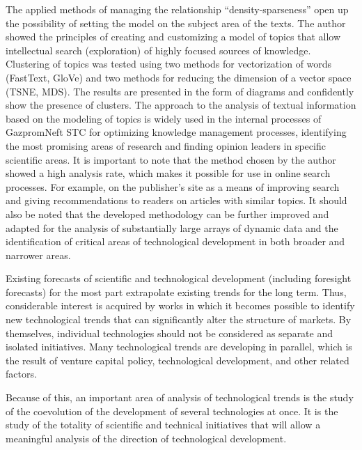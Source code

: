 \documentclass[12pt]{report}
\theoremstyle{definition}
\begin{document}
The applied methods of managing the relationship ``density-sparseness'' open up the possibility of setting the model on the subject area of the texts.
The author showed the principles of creating and customizing a model of topics that allow intellectual search (exploration) of highly focused sources of knowledge.
Clustering of topics was tested using two methods for vectorization of words (FastText, GloVe) and two methods for reducing the dimension of a vector space (TSNE, MDS). 
The results are presented in the form of diagrams and confidently show the presence of clusters.
The approach to the analysis of textual information based on the modeling of topics is widely used in the internal processes of GazpromNeft STC for optimizing knowledge management processes, identifying the most promising areas of research and finding opinion leaders in specific scientific areas.
It is important to note that the method chosen by the author showed a high analysis rate, which makes it possible for use in online search processes. For example, on the publisher's site as a means of improving search and giving recommendations to readers on articles with similar topics.
It should also be noted that the developed methodology can be further improved and adapted for the analysis of substantially large arrays of dynamic data and the identification of critical areas of technological development in both broader and narrower areas.

Existing forecasts of scientific and technological development (including foresight forecasts) for the most part extrapolate existing trends for the long term. Thus, considerable interest is acquired by works in which it becomes possible to identify new technological trends that can significantly alter the structure of markets.
By themselves, individual technologies should not be considered as separate and isolated initiatives. Many technological trends are developing in parallel, which is the result of venture capital policy, technological development, and other related factors.

Because of this, an important area of analysis of technological trends is the study of the coevolution of the development of several technologies at once.
It is the study of the totality of scientific and technical initiatives that will allow a meaningful analysis of the direction of technological development.
\end{document}
